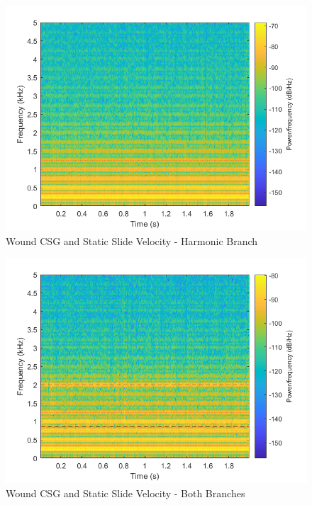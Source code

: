 \documentclass[../main.tex]{subfiles}
\begin{document}
\begin{figure}[h]
    \centering
    \includegraphics[scale=.65]{./images/plots/CSG_Wound_Static_Harm.png}
    \caption{Wound CSG and Static Slide Velocity - Harmonic Branch}
    \label{fig:CSGWoundStaticHarm}
\end{figure}

\begin{figure}[h]
    \centering
    \includegraphics[scale=.65]{./images/plots/CSG_Wound_Static_Both.png}
    \caption{Wound CSG and Static Slide Velocity - Both Branches}
    \label{fig:CSGWoundStaticBoth}
\end{figure}

\clearpage
\end{document}
